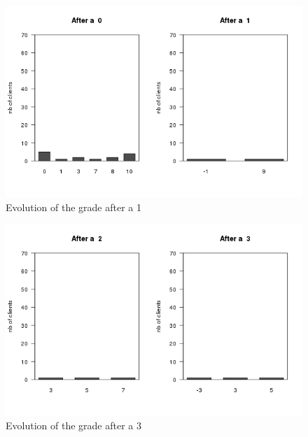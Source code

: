 \documentclass[a4paper, 11pt]{article}
\begin{document}
        \begin{figure}[!ht]
                \centering
                \includegraphics[height = 10 cm]{Remi/Evolution_of_the_grade_after_a_1.png}
                \caption{Evolution of the grade after a 1}
                \label{fig:e_1}
        \end{figure}

        \begin{figure}[!ht]
                \centering
                \includegraphics[height = 10 cm]{Remi/Evolution_of_the_grade_after_a_3.png}
                \caption{Evolution of the grade after a 3}
                \label{fig:e_3}
        \end{figure}
\end{document}

